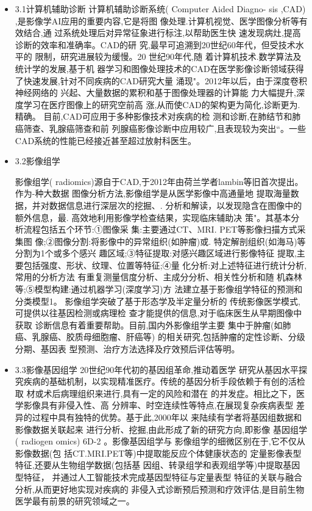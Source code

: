 \documentclass{article}
\begin{document}
\begin{itemize}
    \item 3.1计算机辅助诊断
    计算机辅助诊断系统( Computer Aided Diagno- sis ,CAD) ,是影像学AI应用的重要内容,它是将图 像处理.计算机视觉、医学图像分析等有效结合,通 过系统处理后对异常征象进行标注,以帮助医生快 速发现病灶,提高诊断的效率和准确率。CAD的研 究,最早可追溯到20世纪60年代，但受技术水平的 限制，研究进展较为缓慢。20 世纪90年代,随 着计算机技术.数学算法及统计学的发展,基于机 器学习和图像处理技术的CAD在医学影像诊断领域获得了快速发展,针对不同疾病的CAD研究大量 涌现"。2012年以后，由于深度卷积神经网络的 兴起、大量数据的累积和基于图像处理器的计算能 力大幅提升,深度学习在医疗图像上的研究空前高 涨,从而使CAD的架构更为简化,诊断更为. 精确。
    目前,CAD可应用于多种影像技术对疾病的检 测和诊断,在肺结节和肺癌筛查、乳腺癌筛查和前 列腺癌影像诊断中应用较广,且表现较为突出“。一些CAD系统的性能已经接近甚至超过放射科医生。
    
    \item 3.2影像组学
    
    影像组学( radiomics)源自于CAD,于2012年由荷兰学者lambin等旧首次提出。作为-种大数据 图像分析方法,影像组学是从医学影像中高通量地 提取海量数据，并对数据信息进行深层次的挖掘、. 分析和解读，以发现隐含在图像中的额外信息，最. 高效地利用影像学检查结果，实现临床辅助决 策"。其基本分析流程包括五个环节:①图像采 集:主要通过CT、MRI. PET等影像扫描方式采集图 像;②图像分割:将影像中的异常组织(如肿瘤)或. 特定解剖组织(如海马)等分割为1个或多个感兴 趣区域;③特征提取:对感兴趣区域进行影像特征 提取,主要包括强度、形状、纹理、位置等特征;④量 化分析:对上述特征进行统计分析,常用的分析方法 有重复测量信度分析、主成分分析、相关性分析和随 机森林等;⑤模型构建:通过机器学习(深度学习)方 法建立基于影像组学特征的预测和分类模型1。
    影像组学突破了基于形态学及半定量分析的 传统影像医学模式,可提供以往基因检测或病理检 查才能提供的信息,对于临床医生从早期图像中获取 诊断信息有着重要帮助。目前,国内外影像组学主要 集中于肿瘤(如肺癌、乳腺癌、胶质母细胞瘤、肝癌等) 的相关研究,包括肿瘤的定性诊断、分级分期、基因表 型预测、治疗方法选择及疗效预后评估等明。
    
    \item 3.3影像基因组学
    20世纪90年代初的基因组革命,推动着医学 研究从基因水平探究疾病的基础机制，以实现精准医疗。传统的基因分析手段依赖于有创的活检取 材或术后病理组织来进行,具有一定的风险和潜在 的并发症。相比之下，医学影像具有非侵入性、高 分辨率、时空连续性等特点,在展现复杂疾病表型 差异的过程中具有独特的优势。基于此,2000年以 来陆续有学者将基因组数据和影像数据关联起来 进行分析、挖掘,由此形成了新的研究方向,即影像 基因组学( radiogen omics) 6D-2 。影像基因组学与 影像组学的细微区别在于,它不仅从影像数据(包 括CT.MRI.PET等)中提取能反应个体健康状态的 定量影像表型特征,还要从生物组学数据(包括基 因组、转录组学和表观组学等)中提取基因型特征， 并通过人工智能技术完成基因型特征与定量表型 特征的关联与融合分析,从而更好地实现对疾病的 非侵入式诊断预后预测和疗效评估,是目前生物 医学最有前景的研究领域之一。
    

\end{itemize}
\end{document}
